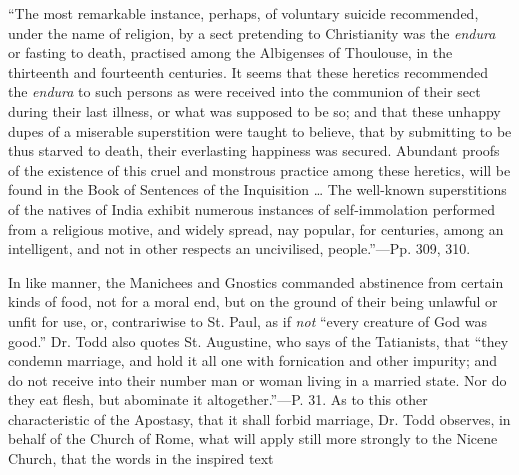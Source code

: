``The most remarkable instance, perhaps, of voluntary suicide
recommended, under the name of religion, by a sect pretending to
Christianity was the \emph{endura} or fasting to death, practised
among the Albigenses of Thoulouse, in the thirteenth and fourteenth
centuries. It seems that these heretics recommended the \emph{endura}
to such persons as were received into the communion of their sect
during their last illness, or what was supposed to be so; and that
these unhappy dupes of a miserable superstition were taught to
believe, that by submitting to be thus starved to death, their
everlasting happiness was secured. Abundant proofs of the existence of
this cruel and monstrous practice among these heretics, will be found
in the Book of Sentences of the Inquisition … The well-known
superstitions of the natives of India exhibit numerous instances of
self-immolation performed from a religious motive, and widely spread,
nay popular, for centuries, among an intelligent, and not in other
respects an uncivilised, people.''—Pp. 309, 310.

In like manner, the Manichees and Gnostics commanded abstinence
from certain kinds of food, not for a moral end, but on the ground of
their being unlawful or unfit for use, or, contrariwise to St. Paul,
as if \emph{not} ``every creature of God was good.'' Dr. Todd also
quotes St. Augustine, who says of the Tatianists, that ``they
condemn marriage, and hold it all one with fornication and other
impurity; and do not receive into their number man or woman living in
a married state. Nor do they eat flesh, but abominate it
altogether.''—P. 31. As to this other characteristic of the
Apostasy, that it shall forbid marriage, Dr. Todd observes, in behalf
of the Church of Rome, what will apply still more strongly to the
Nicene Church, that the words in the inspired text

